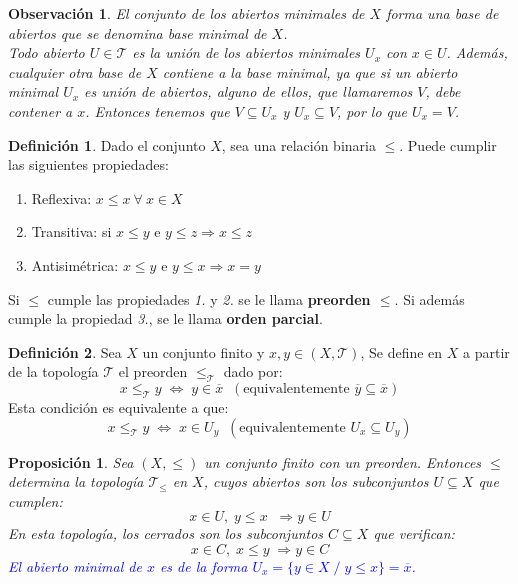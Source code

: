 \documentclass[12pt,twoside]{report}
\newcommand\mc[1]{\mathcal{#1}}
\theoremstyle{azul}
\theoremstyle{azul2}
\newtheorem*{obsx}{Observación}
\theoremstyle{plain}
\newtheorem*{prop}{Proposición}
\theoremstyle{definition}
\newtheorem*{defi}{Definición}
\theoremstyle{remark}
\begin{document}
\begin{obsx}
El conjunto de los abiertos minimales de $X$ forma una base de abiertos que se denomina base minimal de $X$.\\
Todo abierto $U \in \mc{T}$ es la unión de los abiertos minimales $U_x$ con $x \in U$. Además, cualquier otra base de $X$ contiene a la base minimal, ya que si un abierto minimal $U_x$ es unión de abiertos, alguno de ellos, que llamaremos $V$, debe contener a $x$. Entonces tenemos que $V \subseteq U_x$ y $U_x \subseteq V$, por lo que $U_x = V$.
\end{obsx}

\begin{defi}
Dado el conjunto $X$, sea una relación binaria $\leq$. Puede cumplir las siguientes propiedades:
\begin{enumerate}
    \item Reflexiva: $x \leq x \: \forall \: x \in X$
    \item Transitiva: si $x \leq y$ e $y\leq z \Rightarrow x\leq z$
    \item Antisim{\'e}trica: $x \leq y$ e $y \leq x \Rightarrow x=y$ 
\end{enumerate}
Si $\leq$ cumple las propiedades \textit{1.} y \textit{2.} se le llama \textbf{preorden ${\leq}$}. Si además cumple la propiedad \textit{3.}, se le llama \textbf{orden parcial}.
\end{defi}

\begin{defi}
Sea $X$ un conjunto finito y $x,y \in (X,\mc{T})$, Se  define en $X$ a partir de la topología $\mc{T}$ el preorden $\leq_{\mc{T}}$ dado por:
$$x \leq_{\mc{T}} y \; \Leftrightarrow \; y \in \overline{x} \;\; (\text{equivalentemente }\overline{y} \subseteq \overline{x})$$
\color{blue}Esta condición es equivalente a que:
$$x \leq_{\mc{T}} y \; \Leftrightarrow \; x \in U_y \;\; (\text{equivalentemente } U_x \subseteq U_y)$$
\color{black}
\end{defi}

\begin{prop}
Sea $(X,\leq)$ un conjunto finito con un preorden. Entonces $\leq$ determina la topología $\mc{T}_{\leq}$ en $X$, cuyos abiertos son los subconjuntos $U \subseteq X$ que cumplen:$$x\in U, \; y \leq x\;\; \Rightarrow y\in U$$
En esta topología, los cerrados son los subconjuntos $C \subseteq X$ que verifican:  $$x \in C,\; x \leq y \; \Rightarrow y \in C$$ \textcolor{blue}{El abierto minimal de $x$ es de la forma $U_x = \{y \in X \; / \; y \leq x\} = \overline{x}$.}
\end{prop}
\end{document}
